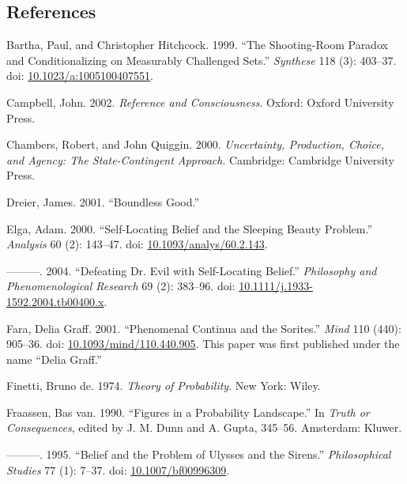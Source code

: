 \documentclass[
  10pt,
  letterpaper,
  DIV=11,
  numbers=noendperiod,
  twoside]{scrartcl}
\newlength{\cslhangindent}
\newenvironment{CSLReferences}[2] %
 {\begin{list}{}{%
  \setlength{\itemindent}{0pt}
  \setlength{\leftmargin}{0pt}
  \setlength{\parsep}{0pt}
  \ifodd #1
   \setlength{\leftmargin}{\cslhangindent}
   \setlength{\itemindent}{-1\cslhangindent}
  \fi
  \setlength{\itemsep}{#2\baselineskip}}}
 {\end{list}}
\begin{document}
\subsection*{References}\label{references}

\label{refs}
\begin{CSLReferences}{1}{0}
Bartha, Paul, and Christopher Hitchcock. 1999. {``The Shooting-Room
Paradox and Conditionalizing on Measurably Challenged Sets.''}
\emph{Synthese} 118 (3): 403--37. doi:
\href{https://doi.org/10.1023/a:1005100407551}{10.1023/a:1005100407551}.

Campbell, John. 2002. \emph{Reference and Consciousness}. Oxford: Oxford
University Press.

Chambers, Robert, and John Quiggin. 2000. \emph{Uncertainty, Production,
Choice, and Agency: The State-Contingent Approach}. Cambridge: Cambridge
University Press.

Dreier, James. 2001. {``Boundless Good.''}

Elga, Adam. 2000. {``Self-Locating Belief and the Sleeping Beauty
Problem.''} \emph{Analysis} 60 (2): 143--47. doi:
\href{https://doi.org/10.1093/analys/60.2.143}{10.1093/analys/60.2.143}.

---------. 2004. {``Defeating Dr. Evil with Self-Locating Belief.''}
\emph{Philosophy and Phenomenological Research} 69 (2): 383--96. doi:
\href{https://doi.org/10.1111/j.1933-1592.2004.tb00400.x}{10.1111/j.1933-1592.2004.tb00400.x}.

Fara, Delia Graff. 2001. {``Phenomenal Continua and the Sorites.''}
\emph{Mind} 110 (440): 905--36. doi:
\href{https://doi.org/10.1093/mind/110.440.905}{10.1093/mind/110.440.905}.
This paper was first published under the name {``Delia Graff.''}

Finetti, Bruno de. 1974. \emph{Theory of Probability}. New York: Wiley.

Fraassen, Bas van. 1990. {``Figures in a Probability Landscape.''} In
\emph{Truth or Consequences}, edited by J. M. Dunn and A. Gupta,
345--56. Amsterdam: Kluwer.

---------. 1995. {``Belief and the Problem of Ulysses and the Sirens.''}
\emph{Philosophical Studies} 77 (1): 7--37. doi:
\href{https://doi.org/10.1007/bf00996309}{10.1007/bf00996309}.


\end{CSLReferences}
\end{document}
